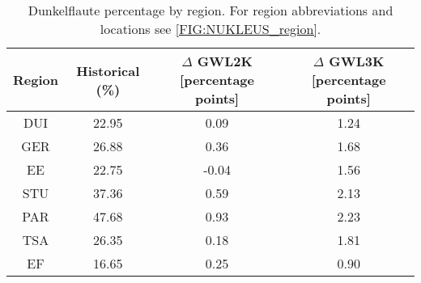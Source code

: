 \begin{table}[!htbp]
\centering
\caption{Dunkelflaute percentage by region. For region abbreviations and locations see \autoref{FIG:NUKLEUS_region}.}
\label{Table:Dunkelflaute_regions}
\begin{tabular}{cccc}
\hline
Region & Historical (\%) & $\Delta$ GWL2K [percentage points] & $\Delta$ GWL3K [percentage points] \\
\hline
DUI & 22.95 & 0.09 & 1.24\\

GER & 26.88 & 0.36 & 1.68\\

EE & 22.75 & -0.04 & 1.56\\

STU & 37.36 & 0.59 & 2.13\\

PAR & 47.68 & 0.93 & 2.23\\

TSA & 26.35 & 0.18 & 1.81\\

EF & 16.65 & 0.25 & 0.90\\

\bottomrule
\end{tabular}
\end{table}
